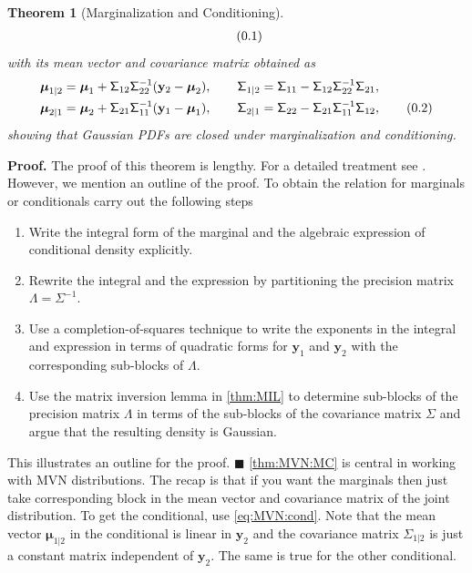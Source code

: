 \documentclass[10pt]{article}
\newtheorem{thm}{Theorem}[section]
\theoremstyle{definition}
\newenvironment{prf}{\noindent\textbf{Proof.}}{\hfill$\blacksquare$}
\newcommand\eqnum{\addtocounter{equation}{1}\tag{\arabic{section}.\arabic{equation}}}
\begin{document}
\begin{thm}[Marginalization and Conditioning]
\begin{align*}
\eqnum
\end{align*}
with its mean vector and covariance matrix obtained as
\begin{align*}
\boldsymbol{\mu}_{1|2} &= \boldsymbol{\mu}_1 + \mathsf{\Sigma}_{12}\mathsf{\Sigma}_{22}^{-1}(\mathbf{y}_2-\boldsymbol{\mu}_2), \qquad
\mathsf{\Sigma}_{1|2} = \mathsf{\Sigma}_{11} - \mathsf{\Sigma}_{12} \mathsf{\Sigma}_{22}^{-1} \mathsf{\Sigma}_{21}, \\
\boldsymbol{\mu}_{2|1} &= \boldsymbol{\mu}_2 + \mathsf{\Sigma}_{21}\mathsf{\Sigma}_{11}^{-1}(\mathbf{y}_1-\boldsymbol{\mu}_1), \qquad
\mathsf{\Sigma}_{2|1} = \mathsf{\Sigma}_{22} - \mathsf{\Sigma}_{21} \mathsf{\Sigma}_{11}^{-1} \mathsf{\Sigma}_{12},
\eqnum
\label{eq:MVN:cond}
\end{align*}
showing that Gaussian PDFs are closed under marginalization and conditioning.
\end{thm}
\begin{prf}
The proof of this theorem is lengthy. For a detailed treatment see \cite{Do2009}. However, we mention an outline of the proof. To obtain the relation for marginals or conditionals carry out the following steps
\begin{enumerate}[noitemsep]
\item Write the integral form of the marginal and the algebraic expression of conditional density explicitly.
\item Rewrite the integral and the expression by partitioning the precision matrix $\mathsf{\Lambda}=\mathsf{\Sigma}^{-1}$.
\item Use a completion-of-squares technique to write the exponents in the integral and  expression in terms of quadratic forms for $\mathbf{y}_1$ and $\mathbf{y}_2$ with the corresponding sub-blocks of $\mathsf{\Lambda}$.
\item Use the matrix inversion lemma in \cref{thm:MIL} to determine sub-blocks of the precision matrix $\mathsf{\Lambda}$ in terms of the sub-blocks of the covariance matrix $\mathsf{\Sigma}$ and argue that the resulting density is Gaussian.
\end{enumerate}
This illustrates an outline for the proof.
\end{prf}
\newline
\indent
\cref{thm:MVN:MC} is central in working with MVN distributions. The recap is that if you want the marginals then just take corresponding block in the mean vector and covariance matrix of the joint distribution. To get the conditional, use \cref{eq:MVN:cond}. Note that the mean vector $\boldsymbol{\mu}_{1|2}$ in the conditional is linear in $\mathbf{y}_2$ and the covariance matrix $\mathsf{\Sigma}_{1|2}$ is just a constant matrix independent of $\mathbf{y}_2$. The same is true for the other conditional.
\end{document}
